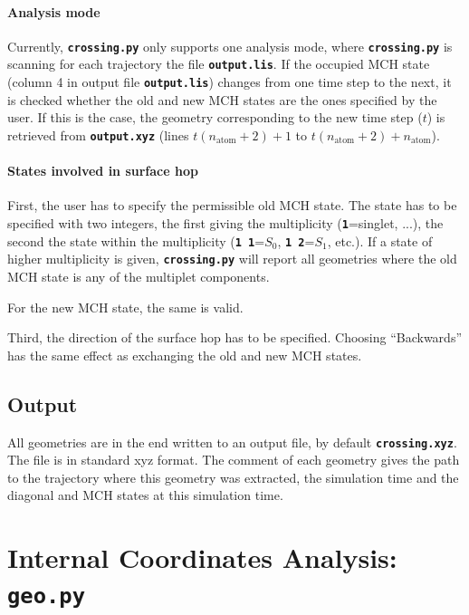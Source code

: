 \documentclass[a4paper,10pt,DIV=15,openany,twoside=false]{scrbook}
\newcommand{\ttt}[1]{\textbf{\texttt{#1}}}
\begin{document}
\paragraph{Analysis mode}

Currently, \ttt{crossing.py} only supports one analysis mode, where \ttt{crossing.py} is scanning for each trajectory the file \ttt{output.lis}. If the occupied MCH state (column 4 in output file \ttt{output.lis}) changes from one time step to the next, it is checked whether the old and new MCH states are the ones specified by the user. If this is the case, the geometry corresponding to the new time step ($t$) is retrieved from \ttt{output.xyz} (lines $t(n_{\text{atom}}+2)+1$ to $t(n_{\text{atom}}+2)+n_{\text{atom}}$). 

\paragraph{States involved in surface hop}

First, the user has to specify the permissible old MCH state. The state has to be specified with two integers, the first giving the multiplicity (\ttt{1}=singlet, ...), the second the state within the multiplicity (\ttt{1 1}=$S_0$, \ttt{1 2}=$S_1$, etc.). If a state of higher multiplicity is given, \ttt{crossing.py} will report all geometries where the old MCH state is any of the multiplet components. 

For the new MCH state, the same is valid.

Third, the direction of the surface hop has to be specified. Choosing ``Backwards'' has the same effect as exchanging the old and new MCH states. 

\subsection{Output}

All geometries are in the end written to an output file, by default \ttt{crossing.xyz}. The file is in standard xyz format. The comment of each geometry gives the path to the trajectory where this geometry was extracted, the simulation time and the diagonal and MCH states at this simulation time. 







\section{Internal Coordinates Analysis: \ttt{geo.py}}\label{sec:geo.py}
\end{document}
